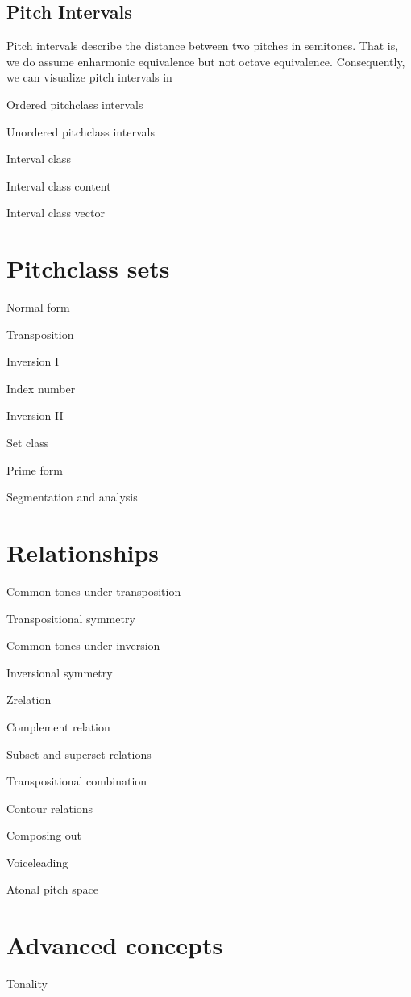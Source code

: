 \documentclass[letterpaper,10pt,english]{sphinxmanual}
\begin{document}
\subsection{Pitch Intervals}
\label{\detokenize{3_set_theory:pitch-intervals}}
Pitch intervals describe the distance between two pitches in semitones. That is, we do assume enharmonic equivalence
but not octave equivalence. Consequently, we can visualize pitch intervals in

Ordered pitch\sphinxhyphen{}class intervals

Unordered pitch\sphinxhyphen{}class intervals

Interval class

Interval class content

Interval class vector


\section{Pitch\sphinxhyphen{}class sets}
\label{\detokenize{3_set_theory:pitch-class-sets}}
Normal form

Transposition

Inversion I

Index number

Inversion II

Set class

Prime form

Segmentation and analysis


\section{Relationships}
\label{\detokenize{3_set_theory:relationships}}
Common tones under transposition

Transpositional symmetry

Common tones under inversion

Inversional symmetry

Z\sphinxhyphen{}relation

Complement relation

Subset and superset relations

Transpositional combination

Contour relations

Composing out

Voice\sphinxhyphen{}leading

Atonal pitch space


\section{Advanced concepts}
\label{\detokenize{3_set_theory:advanced-concepts}}
Tonality
\end{document}
